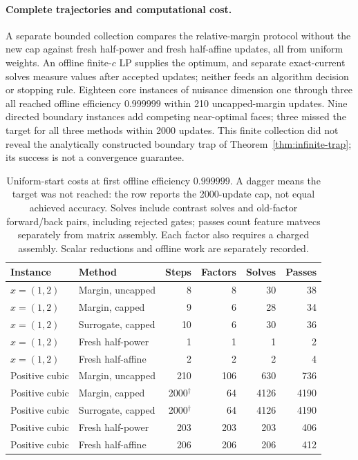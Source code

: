 \documentclass[11pt]{article}
\begin{document}
\paragraph{Complete trajectories and computational cost.}
A separate bounded collection compares the relative-margin protocol without the new cap against fresh half-power and fresh half-affine updates, all from uniform weights. An offline finite-$c$ LP supplies the optimum, and separate exact-current solves measure values after accepted updates; neither feeds an algorithm decision or stopping rule. Eighteen core instances of nuisance dimension one through three all reached offline efficiency $0.999999$ within 210 uncapped-margin updates. Nine directed boundary instances add competing near-optimal faces; three missed the target for all three methods within 2000 updates. This finite collection did not reveal the analytically constructed boundary trap of Theorem~\ref{thm:infinite-trap}; its success is not a convergence guarantee.

\begin{table}[t]
\centering\small
\begin{tabular}{llrrrr}
\toprule
Instance & Method & Steps & Factors & Solves & Passes\\\midrule
$x=(1,2)$ & Margin, uncapped & 8 & 8 & 30 & 38 \\
$x=(1,2)$ & Margin, capped & 9 & 6 & 28 & 34 \\
$x=(1,2)$ & Surrogate, capped & 10 & 6 & 30 & 36 \\
$x=(1,2)$ & Fresh half-power & 1 & 1 & 1 & 2 \\
$x=(1,2)$ & Fresh half-affine & 2 & 2 & 2 & 4 \\
Positive cubic & Margin, uncapped & 210 & 106 & 630 & 736 \\
Positive cubic & Margin, capped & 2000$^\dagger$ & 64 & 4126 & 4190 \\
Positive cubic & Surrogate, capped & 2000$^\dagger$ & 64 & 4126 & 4190 \\
Positive cubic & Fresh half-power & 203 & 203 & 203 & 406 \\
Positive cubic & Fresh half-affine & 206 & 206 & 206 & 412 \\
\bottomrule
\end{tabular}
\caption{Uniform-start costs at first offline efficiency $0.999999$. A dagger means the target was not reached: the row reports the 2000-update cap, not equal achieved accuracy. Solves include contrast solves and old-factor forward/back pairs, including rejected gates; passes count feature matvecs separately from matrix assembly. Each factor also requires a charged assembly. Scalar reductions and offline work are separately recorded.}
\label{tab:r02}
\end{table}
\end{document}

